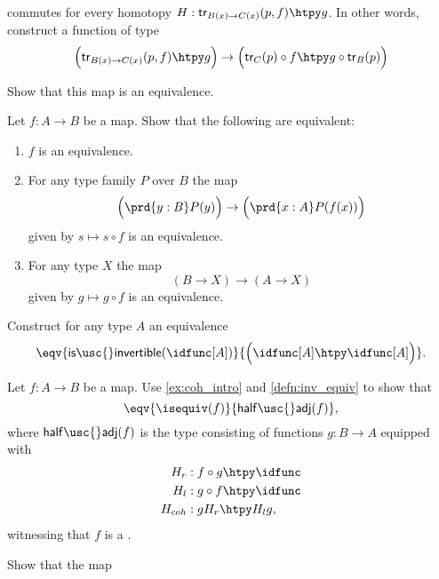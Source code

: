 \begin{exercises}
\begin{subexenum}
\begin{equation*}
\begin{tikzcd}
\end{tikzcd}
\end{equation*}
commutes for every homotopy $H:\mathsf{tr}_{B(x)\to C(x)}(p,f)\htpy g$. In other words, construct a function of type
\begin{equation*} 
\Big(\mathsf{tr}_{B(x)\to C(x)}(p,f)\htpy g\Big)\to \Big(\mathsf{tr}_C(p)\circ f\htpy g\circ \mathsf{tr}_B(p)\Big)
\end{equation*}
\item Show that this map is an equivalence.
\end{subexenum}
\item Let $f:A\to B$ be a map. Show that the following are equivalent:
\begin{enumerate}
\item $f$ is an equivalence.
\item For any type family $P$ over $B$ the map
\begin{equation*}
\Big(\prd{y:B}P(y)\Big)\to\Big(\prd{x:A}P(f(x))\Big)
\end{equation*}
given by $s\mapsto s\circ f$ is an equivalence.
\item For any type $X$ the map
\begin{equation*}
(B\to X)\to (A\to X)
\end{equation*}
given by $g\mapsto g\circ f$ is an equivalence. 
\end{enumerate}
\item Construct for any type $A$ an equivalence
\begin{equation*}
\eqv{\mathsf{is\usc{}invertible}(\idfunc[A])}{\Big(\idfunc[A]\htpy\idfunc[A]\Big)}.
\end{equation*}
\item Let $f:A\to B$ be a map. Use \autoref{ex:coh_intro} and \autoref{defn:inv_equiv} to show that
\begin{equation*}
\eqv{\isequiv(f)}{\mathsf{half\usc{}adj}(f)},
\end{equation*}
where $\mathsf{half\usc{}adj}(f)$ is the type consisting of functions $g:B\to A$ equipped with
\begin{align*}
H_r & : f\circ g\htpy \idfunc \\
H_l & : g\circ f\htpy \idfunc \\
H_{coh} & : g H_r\htpy H_l g,
\end{align*}
witnessing that $f$ is a .
\item 
\begin{subexenum}
\item Show that the map

\end{subexenum}
\end{exercises}
